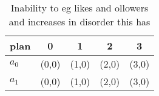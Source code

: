 \documentclass[a4paper]{article}
\begin{document}
\begin{table}
\begin{adjustbox}{width=0.5\columnwidth}
\begin{tabular}{|l|l|l|l|l|}
\hline
\textbf{plan} & \multicolumn{1}{c|}{\textbf{0}} & \multicolumn{1}{c|}{\textbf{1}} & \multicolumn{1}{c|}{\textbf{2}} & \multicolumn{1}{c|}{\textbf{3}} \\ \hline
\textbf{$a_0$}  & (0,0) & (1,0) & (2,0) & (3,0) \\ \hline
\textbf{$a_1$}  & (0,0) & (1,0) & (2,0) & (3,0) \\ \hline
\end{tabular}
\end{adjustbox}
\caption{Inability to eg likes and ollowers and increases in disorder this has
}
\end{table}
\end{document}
